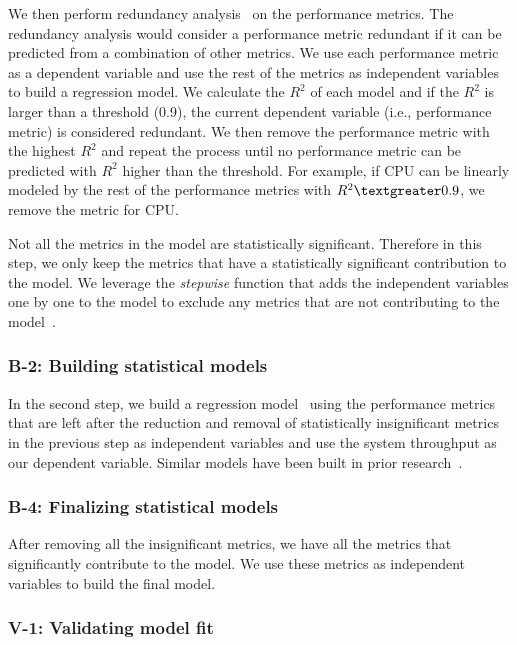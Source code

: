 We then perform redundancy analysis~\cite{harrell2001regression} on the performance metrics. The redundancy analysis would consider a performance metric redundant if it can be predicted from a combination of other metrics. We use each performance metric as a dependent variable and use the rest of the metrics as independent variables to build a regression model. We calculate the $R^2$ of each model and if the $R^2$ is larger than a threshold (0.9)\cite{Syer2016}, the current dependent variable (i.e., performance metric) is considered redundant. We then remove the performance metric with the highest $R^2$ and repeat the process until no performance metric can be predicted with $R^2$ higher than the threshold. For example, if CPU can be linearly modeled by the rest of the performance metrics with $R^2\textgreater0.9$, we remove the metric for CPU.

Not all the metrics in the model are statistically significant. Therefore in this step, we only keep the metrics that have a statistically significant contribution to the model. We leverage the \textit{stepwise} function that adds the independent variables one by one to the model to exclude any metrics that are not contributing to the model~\cite{RInAction}. 

\subsubsection{B-2: Building statistical models}

In the second step, we build a regression model~\cite{freedman2009statistical} using the performance metrics that are left after the reduction and removal of statistically insignificant metrics in the previous step as independent variables and use the system throughput as our dependent variable. Similar models have been built in prior research~\cite{Cohen:2005:CIC:1095810.1095821,xiong2013vperfguard}.

\subsubsection{B-4: Finalizing statistical models}
After removing all the insignificant metrics, we have all the metrics that significantly contribute to the model. We use these metrics as independent variables to build the final model.

\subsubsection{V-1: Validating model fit}

